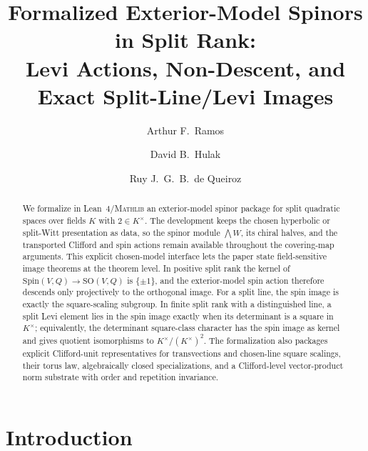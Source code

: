 \documentclass{birkjour}
\title[Formalized exterior-model spinors in split rank]
  {Formalized Exterior-Model Spinors in Split Rank:\\
   Levi Actions, Non-Descent, and Exact Split-Line/Levi Images}
\theoremstyle{plain}
\theoremstyle{definition}
\theoremstyle{remark}
\newcommand{\Spin}{\mathrm{Spin}}
\newcommand{\SO}{\mathrm{SO}}
\newcommand{\Lean}{Lean~4\xspace}
\newcommand{\Mathlib}{\textsc{Mathlib}\xspace}
\begin{document}
\author[A.~F.~Ramos]{Arthur F.~Ramos}
\address{Microsoft, USA}

\author[D.~B.~Hulak]{David B.~Hulak}
\address{Independent Researcher, Brazil}

\author[R.~J.~G.~B.~de Queiroz]{Ruy J.~G.~B.~de Queiroz}
\address{Centro de Inform\'atica, Universidade Federal de Pernambuco, Brazil}



\begin{abstract}
We formalize in \Lean/\Mathlib an exterior-model spinor package for split
quadratic spaces over fields $K$ with $2\in K^\times$. The development keeps the
chosen hyperbolic or split-Witt presentation as data, so the spinor module
$\bigwedge W$, its chiral halves, and the transported Clifford and spin actions
remain available throughout the covering-map arguments. This explicit
chosen-model interface lets the paper state field-sensitive image theorems at
the theorem level. In positive split rank the kernel of
$\Spin(V,Q)\to\SO(V,Q)$ is $\{\pm1\}$, and the exterior-model spin action
therefore descends only projectively to the orthogonal image. For a split line,
the spin image is exactly the square-scaling subgroup. In finite split rank with
a distinguished line, a split Levi element lies in the spin image exactly when
its determinant is a square in $K^\times$; equivalently, the determinant
square-class character has the spin image as kernel and gives quotient
isomorphisms to $K^\times/(K^\times)^2$. The formalization also packages
explicit Clifford-unit representatives for transvections and chosen-line square
scalings, their torus law, algebraically closed specializations, and a
Clifford-level vector-product norm substrate with order and repetition
invariance.
\end{abstract}

\maketitle

\section{Introduction}
\label{sec:intro}
\end{document}
